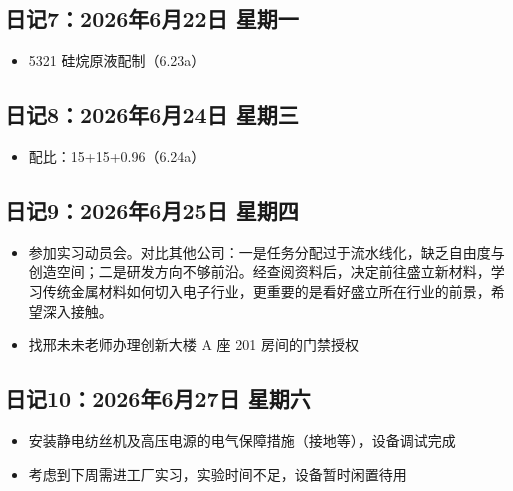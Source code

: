 \documentclass[a4paper, 12pt]{ctexart}
\begin{document}
\vspace{1.5cm}

\subsection*{日记7：2026年6月22日 \quad 星期一}

\begin{itemize}
  \item 5321 硅烷原液配制（6.23a）
\end{itemize}

\vspace{1.5cm}

\subsection*{日记8：2026年6月24日 \quad 星期三}

\begin{itemize}
  \item 配比：15+15+0.96（6.24a）
\end{itemize}

\vspace{1.5cm}

\subsection*{日记9：2026年6月25日 \quad 星期四}

\begin{itemize}
  \item 参加实习动员会。对比其他公司：一是任务分配过于流水线化，缺乏自由度与创造空间；二是研发方向不够前沿。经查阅资料后，决定前往盛立新材料，学习传统金属材料如何切入电子行业，更重要的是看好盛立所在行业的前景，希望深入接触。
  \item 找邢未未老师办理创新大楼 A 座 201 房间的门禁授权
\end{itemize}

\vspace{1.5cm}

\subsection*{日记10：2026年6月27日 \quad 星期六}

\begin{itemize}
  \item 安装静电纺丝机及高压电源的电气保障措施（接地等），设备调试完成
  \item 考虑到下周需进工厂实习，实验时间不足，设备暂时闲置待用
\end{itemize}

\vspace{1.5cm}
\end{document}
